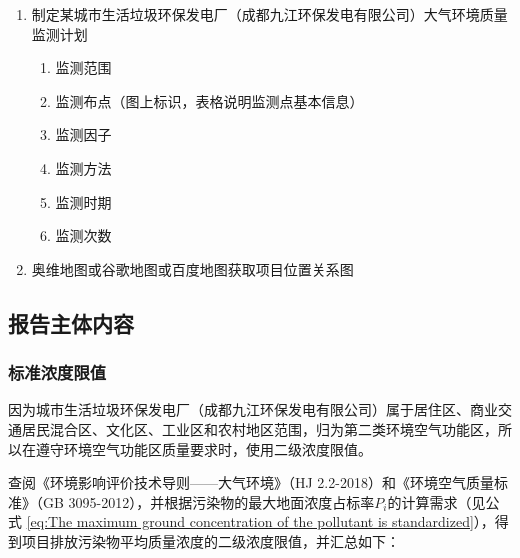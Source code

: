 \begin{enumerate}
    \item 制定某城市生活垃圾环保发电厂（成都九江环保发电有限公司）大气环境质量监测计划
    \begin{enumerate}[label=(\arabic*)]
        \item 监测范围
        \item 监测布点（图上标识，表格说明监测点基本信息）
        \item 监测因子
        \item 监测方法
        \item 监测时期
        \item 监测次数
    \end{enumerate}

    \item 奥维地图或谷歌地图或百度地图获取项目位置关系图
\end{enumerate}


\subsection{报告主体内容}
\subsubsection{标准浓度限值}
因为城市生活垃圾环保发电厂（成都九江环保发电有限公司）属于居住区、商业交通居民混合区、文化区、工业区和农村地区范围，归为第二类环境空气功能区，所以在遵守环境空气功能区质量要求时，使用二级浓度限值。\cite{GB3095-2012}

查阅《环境影响评价技术导则——大气环境》（HJ 2.2-2018）和《环境空气质量标准》（GB 3095-2012），并根据污染物的最大地面浓度占标率$P_i$的计算需求（见公式 \ref{eq:The maximum ground concentration of the pollutant is standardized}），得到项目排放污染物平均质量浓度的二级浓度限值，并汇总如下：

